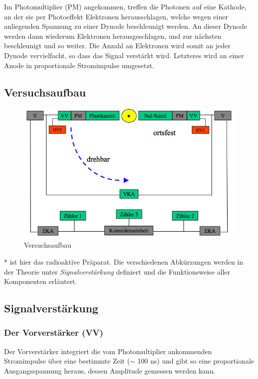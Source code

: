 Im Photomultiplier (PM) angekommen, treffen die Photonen auf eine Kathode, an der sie per Photoeffekt Elektronen herausschlagen, welche wegen einer anliegenden Spannung zu einer Dynode beschleunigt werden. An dieser Dynode werden dann wiederum Elektronen herausgeschlagen, und zur nächsten beschleunigt und so weiter. Die Anzahl an Elektronen wird somit an jeder Dynode vervielfacht, so dass das Signal verstärkt wird. Letzteres wird an einer Anode in proportionale Stromimpulse umgesetzt.

\subsection{Versuchsaufbau}

\begin{figure}[H]
\centering \includegraphics[width = \textwidth]{Bilder/Aufbau.png}
\caption{Versuchsaufbau}
\end{figure}

* ist hier das radioaktive Präparat. Die verschiedenen Abkürzungen werden in der Theorie unter \emph{Signalverstärkung} definiert und die Funktionsweise aller Komponenten erläutert.

\subsection{Signalverstärkung}

\subsubsection{Der Vorverstärker (VV)}

Der Vorverstärker integriert die vom Photomultiplier ankommenden Stromimpulse über eine bestimmte Zeit ($\sim$ 100 ns) und gibt so eine proportionale Ausgangsspannung heraus, dessen Amplitude gemessen werden kann.

